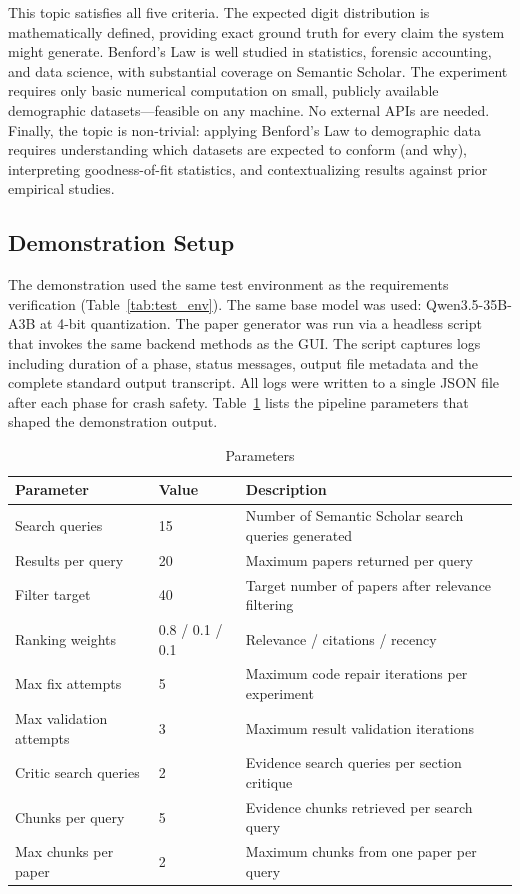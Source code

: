 This topic satisfies all five criteria.
The expected digit distribution is mathematically defined, providing exact ground truth for every claim the system might generate.
Benford's Law is well studied in statistics, forensic accounting, and data science, with substantial coverage on Semantic Scholar.
The experiment requires only basic numerical computation on small, publicly available demographic datasets---feasible on any machine.
No external APIs are needed.
Finally, the topic is non-trivial: applying Benford's Law to demographic data requires understanding which datasets are expected to conform (and why), interpreting goodness-of-fit statistics, and contextualizing results against prior empirical studies.

\subsection{Demonstration Setup}

The demonstration used the same test environment as the requirements verification (Table~\ref{tab:test_env}).
The same base model was used: Qwen3.5-35B-A3B at 4-bit quantization.
The paper generator was run via a headless script that invokes the same backend methods as the GUI.
The script captures logs including duration of a phase, status messages, output file metadata and the complete standard output transcript.
All logs were written to a single JSON file after each phase for crash safety.
Table~\ref{tab:demo_params} lists the pipeline parameters that shaped the demonstration output.

\begin{table}[htbp]
    \centering
    \caption{Parameters}
    \label{tab:demo_params}
    \begin{tabularx}{\textwidth}{l l X}
        \toprule
        \textbf{Parameter} & \textbf{Value} & \textbf{Description} \\
        \midrule
        Search queries & 15 & Number of Semantic Scholar search queries generated \\
        Results per query & 20 & Maximum papers returned per query \\
        Filter target & 40 & Target number of papers after relevance filtering \\
        Ranking weights & 0.8 / 0.1 / 0.1 & Relevance / citations / recency \\
        \addlinespace
        Max fix attempts & 5 & Maximum code repair iterations per experiment \\
        Max validation attempts & 3 & Maximum result validation iterations \\
        \addlinespace
        Critic search queries & 2 & Evidence search queries per section critique \\
        Chunks per query & 5 & Evidence chunks retrieved per search query \\
        Max chunks per paper & 2 & Maximum chunks from one paper per query \\
        \bottomrule
    \end{tabularx}
\end{table}

